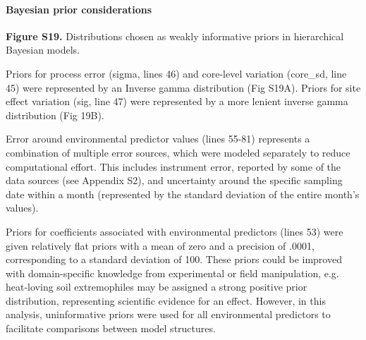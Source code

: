 \documentclass[11pt]{article}
\begin{document}
\paragraph{Bayesian prior considerations}

\textbf{Figure S19.} Distributions chosen as weakly informative priors in hierarchical Bayesian models. 

Priors for process error (sigma, lines 46) and core-level variation (core\_sd, line 45) were represented by an Inverse gamma distribution (Fig S19A). Priors for site effect variation (sig, line 47) were represented by a more lenient inverse gamma distribution (Fig 19B).

Error around environmental predictor values (lines 55-81) represents a combination of multiple error sources, which were modeled separately to reduce computational effort. This includes instrument error, reported by some of the data sources (see Appendix S2), and uncertainty around the specific sampling date within a month (represented by the standard deviation of the entire month's values). 

Priors for coefficients associated with environmental predictors (lines 53) were given relatively flat priors with a mean of zero and a precision of .0001, corresponding to a standard deviation of 100. These priors could be improved with domain-specific knowledge from experimental or field manipulation, e.g. heat-loving soil extremophiles may be assigned a strong positive prior distribution, representing scientific evidence for an effect. However, in this analysis, uninformative priors were used for all environmental predictors to facilitate comparisons between model structures.
\end{document}
